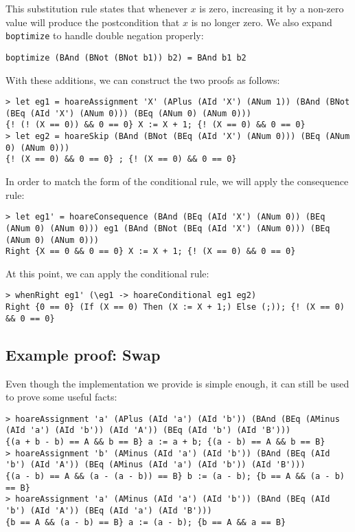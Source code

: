 \documentclass{article}
\begin{document}
This substitution rule states that whenever $x$ is zero, increasing it by a non-zero value will produce the postcondition that $x$ is no longer zero. We also expand \texttt{boptimize} to handle double negation properly:

\begin{lstlisting}
boptimize (BAnd (BNot (BNot b1)) b2) = BAnd b1 b2
\end{lstlisting}

With these additions, we can construct the two proofs as follows:

\begin{lstlisting}
> let eg1 = hoareAssignment 'X' (APlus (AId 'X') (ANum 1)) (BAnd (BNot (BEq (AId 'X') (ANum 0))) (BEq (ANum 0) (ANum 0)))
{! (! (X == 0)) && 0 == 0} X := X + 1; {! (X == 0) && 0 == 0}
> let eg2 = hoareSkip (BAnd (BNot (BEq (AId 'X') (ANum 0))) (BEq (ANum 0) (ANum 0)))
{! (X == 0) && 0 == 0} ; {! (X == 0) && 0 == 0}
\end{lstlisting}

In order to match the form of the conditional rule, we will apply the consequence rule:

\begin{lstlisting}
> let eg1' = hoareConsequence (BAnd (BEq (AId 'X') (ANum 0)) (BEq (ANum 0) (ANum 0))) eg1 (BAnd (BNot (BEq (AId 'X') (ANum 0))) (BEq (ANum 0) (ANum 0)))
Right {X == 0 && 0 == 0} X := X + 1; {! (X == 0) && 0 == 0}
\end{lstlisting}

At this point, we can apply the conditional rule:

\begin{lstlisting}
> whenRight eg1' (\eg1 -> hoareConditional eg1 eg2)
Right {0 == 0} (If (X == 0) Then (X := X + 1;) Else (;)); {! (X == 0) && 0 == 0}
\end{lstlisting}

\subsection{Example proof: Swap}

Even though the implementation we provide is simple enough, it can still be used to prove some useful facts:

\begin{lstlisting}
> hoareAssignment 'a' (APlus (AId 'a') (AId 'b')) (BAnd (BEq (AMinus (AId 'a') (AId 'b')) (AId 'A')) (BEq (AId 'b') (AId 'B')))
{(a + b - b) == A && b == B} a := a + b; {(a - b) == A && b == B}
> hoareAssignment 'b' (AMinus (AId 'a') (AId 'b')) (BAnd (BEq (AId 'b') (AId 'A')) (BEq (AMinus (AId 'a') (AId 'b')) (AId 'B')))
{(a - b) == A && (a - (a - b)) == B} b := (a - b); {b == A && (a - b) == B}
> hoareAssignment 'a' (AMinus (AId 'a') (AId 'b')) (BAnd (BEq (AId 'b') (AId 'A')) (BEq (AId 'a') (AId 'B')))
{b == A && (a - b) == B} a := (a - b); {b == A && a == B}
\end{lstlisting}
\end{document}
